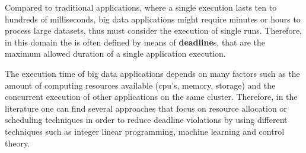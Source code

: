 Compared to traditional applications, where a single execution lasts ten to hundreds of milliseconds, big data applications might require minutes or hours to process large datasets, thus \qos must consider the execution of single runs. Therefore, in this domain the \qos is often defined by means of \textbf{deadline}s, that are the maximum allowed duration of a single application execution. %
 
The execution time of big data applications depends on many factors such as the amount of computing resources available (cpu's, memory, storage) and the concurrent execution of other applications on the same cluster. Therefore, in the literature one can find several approaches \cite{Verma2011, Hindman2011, Cheng2015} that focus on resource allocation or scheduling techniques in order to reduce deadline violations by using different techniques such as integer linear programming, machine learning and control theory.  %

%

